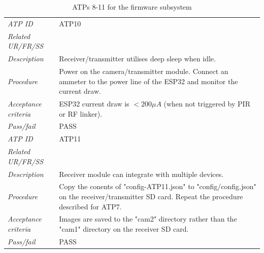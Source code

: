 \documentclass[class=report,11pt,crop=false]{standalone}
\begin{document}
\begin{table}[!ht]
\begin{scriptsize}
\begin{tabularx}{\textwidth}{|p{} X|}
        \textit{ATP ID} & ATP10\\
        \textit{Related UR/FR/SS} & \\
        \textit{Description} & Receiver/transmitter utilises deep sleep when idle.\\
        \textit{Procedure} & Power on the camera/transmitter module. Connect an ammeter to the power line of the ESP32 and monitor the current draw. \\
        \textit{Acceptance criteria} & ESP32 current draw is $ < 200 \mu A $ (when not triggered by PIR or RF linker).\\ 
        \textit{Pass/fail} & PASS\\ \hline

        \textit{ATP ID} & ATP11\\
        \textit{Related UR/FR/SS} & \\
        \textit{Description} & Receiver module can integrate with multiple devices.\\
        \textit{Procedure} & Copy the conents of "config-ATP11.json" to "config/config.json" on the receiver/transmitter SD card. Repeat the procedure described for ATP7. \\
        \textit{Acceptance criteria} & Images are saved to the "cam2" directory rather than the "cam1" directory on the receiver SD card.\\ 
        \textit{Pass/fail} & PASS\\ \hline
        

    \end{tabularx}
    \end{scriptsize}
    \caption{ATPs 8-11 for the firmware subsystem}
    \label{tab:firmware-atps2}
\end{table}

\ifstandalone

\printnoidxglossary[type=\acronymtype,nonumberlist]
\fi
\end{document}
